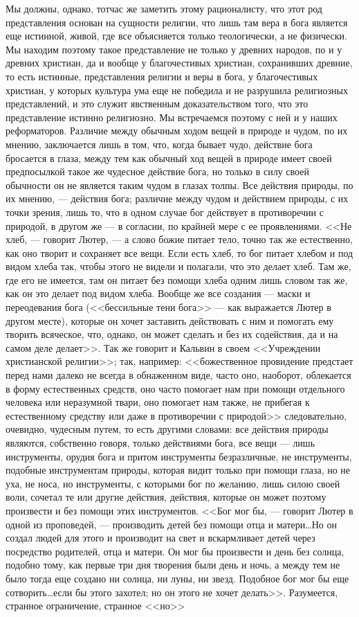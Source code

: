 \documentclass[12pt]{article}
\begin{document}
Мы должны, однако, тотчас же заметить этому рационалисту, что этот род представления основан на сущности религии, что лишь там вера в бога является еще истинной, живой, где все объясняется только теологически, а не физически. Мы находим поэтому такое представление не только у древних народов, по и у древних христиан, да и вообще у благочестивых христиан, сохранивших древние, то есть истинные, представления религии и веры в бога, у благочестивых христиан, у которых культура ума еще не победила и не разрушила религиозных представлений, и это служит явственным доказательством того, что это представление истинно религиозно. Мы встречаемся поэтому с ней и у наших реформаторов. Различие между обычным ходом вещей в природе и чудом, по их мнению, заключается лишь в том, что, когда бывает чудо, действие бога бросается в глаза, между тем как обычный ход вещей в природе имеет своей предпосылкой такое же чудесное действие бога, но только в силу своей обычности он не является таким чудом в глазах толпы. Все действия природы, по их мнению, --- действия бога; различие между чудом и действием природы, с их точки зрения, лишь то, что в одном случае бог действует в противоречии с природой, в другом же --- в согласии, по крайней мере с ее проявлениями. <<Не хлеб, --- говорит Лютер, --- а слово божие питает тело, точно так же естественно, как оно творит и сохраняет все вещи. Если есть хлеб, то бог питает хлебом и под видом хлеба так, чтобы этого не видели и полагали, что это делает хлеб. Там же, где его не имеется, там он питает без помощи хлеба одним лишь словом так же, как он это делает под видом хлеба. Вообще же все создания --- маски и переодевания бога (<<бессильные тени бога>>  --- как выражается Лютер в другом месте), которые он хочет заставить действовать с ним и помогать ему творить всяческое, что, однако, он может сделать и без их содействия, да и на самом деле делает>>. Так же говорит и Кальвин в своем <<Учреждении христианской религии>>; так, например: <<божественное провидение предстает перед нами далеко не всегда в обнаженном виде, часто оно, наоборот, облекается в форму естественных средств, оно часто помогает нам при помощи отдельного человека или неразумной твари, оно помогает нам также, не прибегая к естественному средству или даже в противоречии с природой>>  следовательно, очевидно, чудесным путем, то есть другими словами: все действия природы являются, собственно говоря, только действиями бога, все вещи --- лишь инструменты, орудия бога и притом инструменты безразличные, не инструменты, подобные инструментам природы, которая видит только при помощи глаза, но не уха, не носа, но инструменты, с которыми бог по желанию, лишь силою своей воли, сочетал те или другие действия, действия, которые он может поэтому произвести и без помощи этих инструментов. <<Бог мог бы, --- говорит Лютер в одной из проповедей, --- производить детей без помощи отца и матери\dots Но он создал людей для этого и производит на свет и вскармливает детей через посредство родителей, отца и матери. Он мог бы произвести и день без солнца, подобно тому, как первые три дня творения были день и ночь, а между тем не было тогда еще создано ни солнца, ни луны, ни звезд. Подобное бог мог бы еще сотворить\dots если бы этого захотел; но он этого не хочет делать>>. Разумеется, странное ограничение, странное <<но>>  
\end{document}

